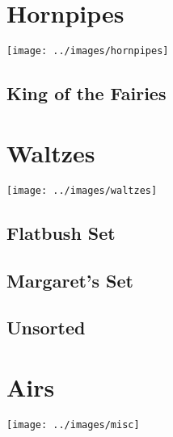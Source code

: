 \documentclass[12pt]{report}
\newcommand*{\cleartoleftpage}{%
	\clearpage
	\ifodd\value{page}\hbox{}\newpage\fi
}
\begin{document}
\cleartoleftpage
\chapter*{Hornpipes}
\begin{center}
\texttt{[image: ../images/hornpipes]}
\end{center}

	\section*{King of the Fairies}
	

\cleartoleftpage
\chapter*{Waltzes}
\begin{center}
\texttt{[image: ../images/waltzes]}
\end{center}

	\section*{Flatbush Set}
	

	\cleartoleftpage
	\section*{Margaret's Set}
	

	\cleartoleftpage
	\section*{Unsorted}
	

\cleartoleftpage
\chapter*{Airs}
\begin{center}
\texttt{[image: ../images/misc]}
\end{center}

	

\end{document}
